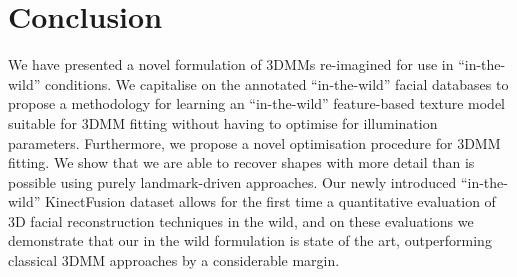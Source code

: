 %
\section{Conclusion}
\label{sec:conclusion}

We have presented a novel formulation of 3DMMs re-imagined for use in ``in-the-wild'' conditions. We capitalise on the annotated ``in-the-wild'' facial databases to propose a methodology for learning an ``in-the-wild'' feature-based texture model suitable for 3DMM fitting without having to optimise for illumination parameters. Furthermore, we propose a novel optimisation procedure for 3DMM fitting. We show that we are able to recover shapes with more detail than is possible using purely landmark-driven approaches.
Our newly introduced ``in-the-wild'' KinectFusion dataset allows for the first time a quantitative evaluation of 3D facial reconstruction techniques in the wild, and on these evaluations we demonstrate that our in the wild formulation is state of the art, outperforming classical 3DMM approaches by a considerable margin.

